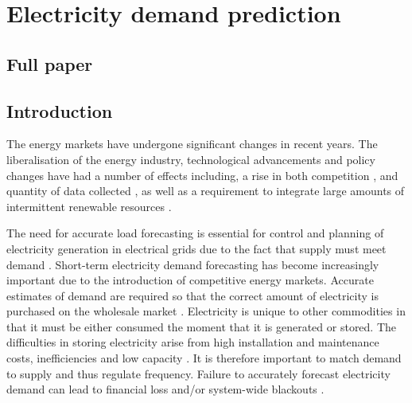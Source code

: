 \chapter{Electricity demand prediction}

\ifpdf
    \graphicspath{{Chapter3/Figs/Raster/}{Chapter3/Figs/PDF/}{Chapter3/Figs/}}
\else
    \graphicspath{{Chapter3/Figs/Vector/}{Chapter3/Figs/}}
\fi

\section{Full paper}

\section{Introduction}

The energy markets have undergone significant changes in recent years. The liberalisation of the energy industry, technological advancements and policy changes have had a number of effects \cite{Viegas2016} including, a rise in both competition \cite{sioshansi_2009}, and quantity of data collected \cite{Clastres2011}, as well as a requirement to integrate large amounts of intermittent renewable resources \cite{Haben2013a,Kamgarpour2013,Curves2014}.

The need for accurate load forecasting is essential for control and planning of electricity generation in electrical grids due to the fact that supply must meet demand \cite{Lu1993}. Short-term electricity demand forecasting has become increasingly important due to the introduction of competitive energy markets. Accurate estimates of demand are required so that the correct amount of electricity is purchased on the wholesale market \cite{Dillon1991}. Electricity is unique to other commodities in that it must be either consumed the moment that it is generated or stored. The difficulties in storing electricity arise from high installation and maintenance costs, inefficiencies and low capacity \cite{Poonpun2008}. It is therefore important to match demand to supply and thus regulate frequency. Failure to accurately forecast electricity demand can lead to financial loss and/or system-wide blackouts \cite{Hines2008}.

